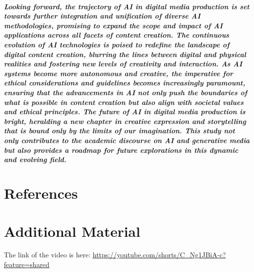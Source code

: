 \documentclass[11pt,a4paper,oneside]{report}
\begin{document}
\paragraph{Looking forward, the trajectory of AI in digital media production is set towards further integration and unification of diverse AI methodologies, promising to expand the scope and impact of AI applications across all facets of content creation. The continuous evolution of AI technologies is poised to redefine the landscape of digital content creation, blurring the lines between digital and physical realities and fostering new levels of creativity and interaction. As AI systems become more autonomous and creative, the imperative for ethical considerations and guidelines becomes increasingly paramount, ensuring that the advancements in AI not only push the boundaries of what is possible in content creation but also align with societal values and ethical principles. The future of AI in digital media production is bright, heralding a new chapter in creative expression and storytelling that is bound only by the limits of our imagination. This study not only contributes to the academic discourse on AI and generative media but also provides a roadmap for future explorations in this dynamic and evolving field.}

\chapter*{References}
\label{references}



\printbibliography[heading=none]



\appendix

\chapter{Additional Material}
\label{appendix-a}

The link of the video is here: \url{https://youtube.com/shorts/C_Ng1JBiA-c?feature=shared}
\end{document}
